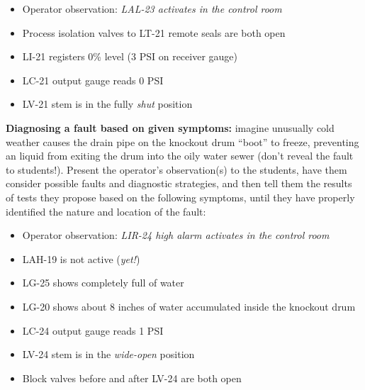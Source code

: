 \begin{itemize}
\item{} Operator observation: {\it LAL-23 activates in the control room}
\item{} Process isolation valves to LT-21 remote seals are both open
\item{} LI-21 registers 0\% level (3 PSI on receiver gauge)
\item{} LC-21 output gauge reads 0 PSI
\item{} LV-21 stem is in the fully {\it shut} position
\end{itemize}



\vskip 10pt

\filbreak



\noindent
{\bf Diagnosing a fault based on given symptoms:} imagine unusually cold weather causes the drain pipe on the knockout drum ``boot'' to freeze, preventing an liquid from exiting the drum into the oily water sewer (don't reveal the fault to students!).  Present the operator's observation(s) to the students, have them consider possible faults and diagnostic strategies, and then tell them the results of tests they propose based on the following symptoms, until they have properly identified the nature and location of the fault:

\begin{itemize}
\item{} Operator observation: {\it LIR-24 high alarm activates in the control room}
\item{} LAH-19 is not active ({\it yet!})
\item{} LG-25 shows completely full of water
\item{} LG-20 shows about 8 inches of water accumulated inside the knockout drum
\item{} LC-24 output gauge reads 1 PSI
\item{} LV-24 stem is in the {\it wide-open} position
\item{} Block valves before and after LV-24 are both open
\end{itemize}





